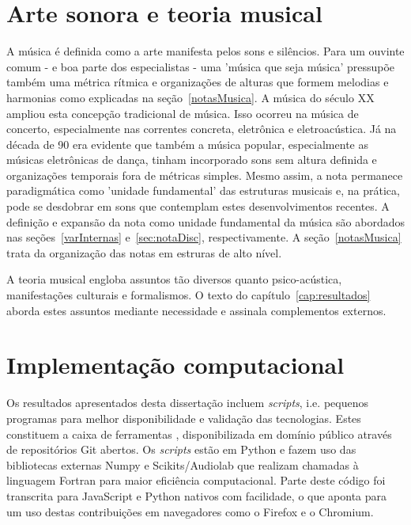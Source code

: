     \section{Arte sonora e teoria musical}

    A música é definida como a arte manifesta pelos sons e silêncios. Para um ouvinte comum - e boa parte dos especialistas - uma 'música que seja música' pressupõe também uma métrica rítmica e organizações de alturas que formem melodias e harmonias como explicadas na seção~\ref{notasMusica}. A música do século XX ampliou esta concepção tradicional de música. Isso ocorreu na música de concerto, especialmente nas correntes concreta, eletrônica e eletroacústica. Já na década de 90 era evidente que também a música popular, especialmente as músicas eletrônicas de dança, tinham incorporado sons sem altura definida e organizações temporais fora de métricas simples. Mesmo assim, a nota permanece paradigmática como 'unidade fundamental' das estruturas musicais e, na prática, pode se desdobrar em sons que contemplam estes desenvolvimentos recentes. A definição e expansão da nota como unidade fundamental da música são abordados nas seções~\ref{varInternas} e~\ref{sec:notaDisc}, respectivamente. A seção~\ref{notasMusica} trata da organização das notas em estruras de alto nível.\cite{Wisnick,Webern,Lerdahl,Cook,Lacerda} 

A teoria musical engloba assuntos tão diversos quanto psico-acústica, manifestações culturais e formalismos. O texto do capítulo~\ref{cap:resultados} aborda estes assuntos mediante necessidade e assinala complementos externos.\cite{Zamacois,Schoenberg,microsound}



    \section{Implementação computacional}
Os resultados apresentados desta dissertação incluem \emph{scripts}, i.e. pequenos programas para melhor disponibilidade e validação das tecnologias. Estes constituem a caixa de ferramentas \massa, disponibilizada em domínio público através de repositórios Git abertos.\cite{gitBook}
Os \emph{scripts} estão em Python e fazem uso das bibliotecas externas Numpy e Scikits/Audiolab que realizam chamadas à linguagem Fortran para maior eficiência computacional. Parte deste código foi transcrita para JavaScript e Python nativos com facilidade, o que aponta para um uso destas contribuições em navegadores como o Firefox e o Chromium.\cite{numpy,audiolab,tutPython,python}

